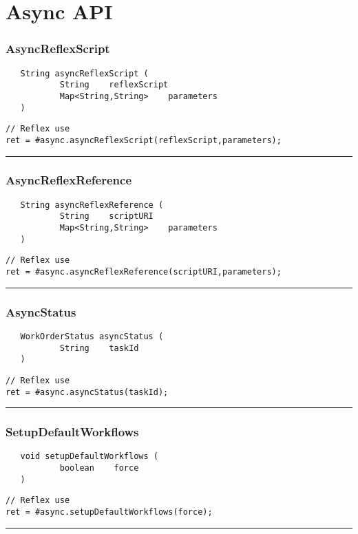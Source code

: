 \section{Async API}

\subsubsection{AsyncReflexScript}
\label{Api:AsyncReflexScript}
\begin{verbatim}
   String asyncReflexScript (
           String    reflexScript
           Map<String,String>    parameters
   )
\end{verbatim}
\begin{lstlisting}[language=reflex]
// Reflex use
ret = #async.asyncReflexScript(reflexScript,parameters);
\end{lstlisting}



\rule{15cm}{2pt}
\subsubsection{AsyncReflexReference}
\label{Api:AsyncReflexReference}
\begin{verbatim}
   String asyncReflexReference (
           String    scriptURI
           Map<String,String>    parameters
   )
\end{verbatim}
\begin{lstlisting}[language=reflex]
// Reflex use
ret = #async.asyncReflexReference(scriptURI,parameters);
\end{lstlisting}



\rule{15cm}{2pt}
\subsubsection{AsyncStatus}
\label{Api:AsyncStatus}
\begin{verbatim}
   WorkOrderStatus asyncStatus (
           String    taskId
   )
\end{verbatim}
\begin{lstlisting}[language=reflex]
// Reflex use
ret = #async.asyncStatus(taskId);
\end{lstlisting}



\rule{15cm}{2pt}
\subsubsection{SetupDefaultWorkflows}
\label{Api:SetupDefaultWorkflows}
\begin{verbatim}
   void setupDefaultWorkflows (
           boolean    force
   )
\end{verbatim}
\begin{lstlisting}[language=reflex]
// Reflex use
ret = #async.setupDefaultWorkflows(force);
\end{lstlisting}



\rule{15cm}{2pt}
